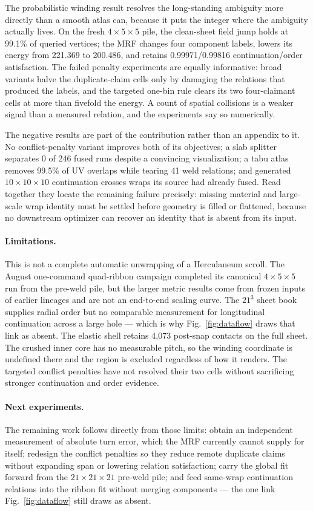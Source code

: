 The probabilistic winding result resolves the long-standing ambiguity more directly than a smooth atlas can, because it puts the integer where the ambiguity actually lives. On the fresh $4\times5\times5$ pile, the clean-sheet field jump holds at 99.1\% of queried vertices; the MRF changes four component labels, lowers its energy from 221.369 to 200.486, and retains 0.99971/0.99816 continuation/order satisfaction. The failed penalty experiments are equally informative: broad variants halve the duplicate-claim cells only by damaging the relations that produced the labels, and the targeted one-bin rule clears its two four-claimant cells at more than fivefold the energy. A count of spatial collisions is a weaker signal than a measured relation, and the experiments say so numerically.

The negative results are part of the contribution rather than an appendix to it. No conflict-penalty variant improves both of its objectives; a slab splitter separates 0 of 246 fused runs despite a convincing visualization; a tabu atlas removes 99.5\% of UV overlaps while tearing 41 weld relations; and generated $10\times10\times10$ continuation crosses wraps its source had already fused. Read together they locate the remaining failure precisely: missing material and large-scale wrap identity must be settled before geometry is filled or flattened, because no downstream optimizer can recover an identity that is absent from its input.

\paragraph{Limitations.} This is not a complete automatic unwrapping of a Herculaneum scroll. The August one-command quad-ribbon campaign completed its canonical $4\times5\times5$ run from the pre-weld pile, but the larger metric results come from frozen inputs of earlier lineages and are not an end-to-end scaling curve. The $21^3$ sheet book supplies radial order but no comparable measurement for longitudinal continuation across a large hole --- which is why Fig.~\ref{fig:dataflow} draws that link as absent. The elastic shell retains 4,073 post-snap contacts on the full sheet. The crushed inner core has no measurable pitch, so the winding coordinate is undefined there and the region is excluded regardless of how it renders. The targeted conflict penalties have not resolved their two cells without sacrificing stronger continuation and order evidence.

\paragraph{Next experiments.} The remaining work follows directly from those limits: obtain an independent measurement of absolute turn error, which the MRF currently cannot supply for itself; redesign the conflict penalties so they reduce remote duplicate claims without expanding span or lowering relation satisfaction; carry the global fit forward from the $21\times21\times21$ pre-weld pile; and feed same-wrap continuation relations into the ribbon fit without merging components --- the one link Fig.~\ref{fig:dataflow} still draws as absent.

